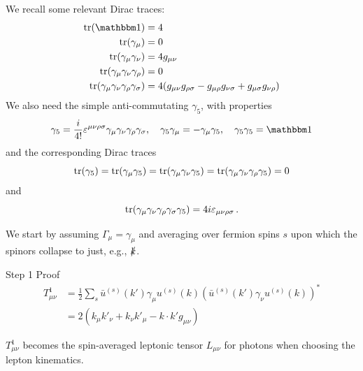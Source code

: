 We recall some relevant Dirac traces:
\begin{align}
    \tr(\mathbbm 1) &= 4 \\
    \tr(\gamma_\mu) &= 0 \\
    \tr(\gamma_\mu\gamma_\nu) &= 4g_{\mu\nu} \\
    \tr(\gamma_\mu\gamma_\nu\gamma_\rho) &= 0 \\
    \tr(\gamma_\mu\gamma_\nu\gamma_\rho\gamma_\sigma) &= 4(g_{\mu\nu}g_{\rho\sigma} - g_{\mu\rho}g_{\nu\sigma} + g_{\mu\sigma}g_{\nu\rho}) \label{eq:trDirac4}
\end{align}
We also need the simple anti-commutating $\gamma_5$, with properties
\begin{equation}
    \gamma_5 = \frac i {4!}\varepsilon^{\mu\nu\rho\sigma}\gamma_\mu\gamma_\nu\gamma_\rho\gamma_\sigma, \quad \gamma_5\gamma_\mu = - \gamma_\mu\gamma_5, \quad \gamma_5\gamma_5 = \mathbbm 1
\end{equation}
and the corresponding Dirac traces
\begin{equation}
    \tr(\gamma_5) = \tr(\gamma_\mu\gamma_5) = \tr(\gamma_\mu\gamma_\nu\gamma_5) = \tr(\gamma_\mu\gamma_\nu\gamma_\rho\gamma_5) = 0
\end{equation}
and
\begin{equation}
    \tr(\gamma_\mu\gamma_\nu\gamma_\rho\gamma_\sigma\gamma_5) = 4i\varepsilon_{\mu\nu\rho\sigma}\,. \label{eq:trDirac5}
\end{equation}

We start by assuming $\Gamma_\mu = \gamma_\mu$ and averaging over fermion spins $s$ upon which the spinors collapse to just, e.g., $\slashed{k}$.
\begin{exercisebox}[label=box:exLOT1]{Step 1}
    Proof
    \begin{align}
        T^1_{\mu\nu} &= \frac 1 2 \sum_{s} \bar u^{(s)}(k')\gamma_\mu u^{(s)}(k) \left(\bar u^{(s)}(k')\gamma_\nu u^{(s)}(k)\right)^*\\
         &= 2\left(k_\mu k'_\nu + k_\nu k'_\mu - k \cdot k' g_{\mu\nu}\right)
    \end{align}
\end{exercisebox}
\noindent{}$T^1_{\mu\nu}$ becomes the spin-averaged leptonic tensor $L_{\mu\nu}$ for photons when choosing the lepton kinematics.

